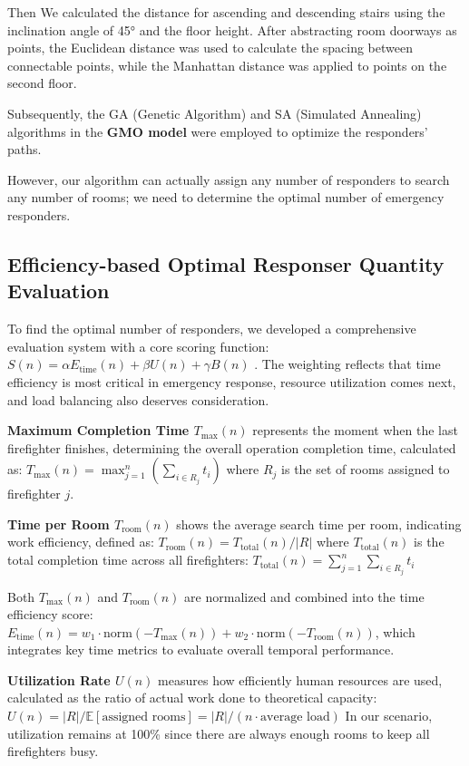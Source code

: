 Then We calculated the distance for ascending and descending stairs using the inclination angle of 45° and the floor height. After abstracting room doorways as points, the Euclidean distance was used to calculate the spacing between connectable points, while the Manhattan distance was applied to points on the second floor.

Subsequently, the GA (Genetic Algorithm) and SA (Simulated Annealing) algorithms in the \textbf{GMO model} were employed to optimize the responders' paths.


However, our algorithm can actually assign any number of responders to search any number of rooms; we need to determine the optimal number of emergency responders.





\subsection{Efficiency-based Optimal Responser Quantity Evaluation}

To find the optimal number of responders, we developed a comprehensive evaluation system with a core scoring function: $S(n) = \alpha E_{\text{time}}(n) + \beta U(n) + \gamma B(n)$ . The weighting reflects that time efficiency is most critical in emergency response, resource utilization comes next, and load balancing also deserves consideration.

\textbf{Maximum Completion Time $T_{\text{max}}(n)$} represents the moment when the last firefighter finishes, determining the overall operation completion time, calculated as: $T_{\text{max}}(n) = \max_{j=1}^{n} \left( \sum_{i \in R_j} t_i \right)$ where $R_j$ is the set of rooms assigned to firefighter $j$. 

\textbf{Time per Room $T_{\text{room}}(n)$} shows the average search time per room, indicating work efficiency, defined as: $T_{\text{room}}(n) = T_{\text{total}}(n)/|R|$ where $T_{\text{total}}(n)$ is the total completion time across all firefighters: $T_{\text{total}}(n) = \sum_{j=1}^{n} \sum_{i \in R_j} t_i$ 

Both $T_{\text{max}}(n)$ and $T_{\text{room}}(n)$ are normalized and combined into the time efficiency score: $E_{\text{time}}(n) = w_1 \cdot \text{norm}(-T_{\text{max}}(n)) + w_2 \cdot \text{norm}(-T_{\text{room}}(n))$, which integrates key time metrics to evaluate overall temporal performance. 

\textbf{Utilization Rate $U(n)$} measures how efficiently human resources are used, calculated as the ratio of actual work done to theoretical capacity: $U(n) = |R|/\mathbb{E}[\text{assigned rooms}] = |R|/(n \cdot \text{average load})$ In our scenario, utilization remains at 100\% since there are always enough rooms to keep all firefighters busy.

